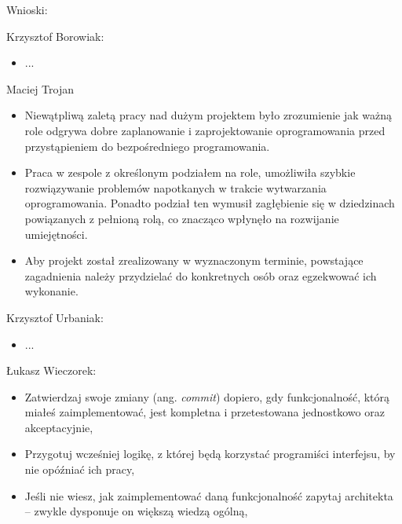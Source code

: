 Wnioski:
\begin{description}
\item Krzysztof Borowiak:
\begin{itemize}
\item ...
\end{itemize}
\item Maciej Trojan
\begin{itemize}
\item Niewątpliwą zaletą pracy nad dużym projektem było zrozumienie jak ważną role odgrywa
dobre zaplanowanie i zaprojektowanie oprogramowania przed przystąpieniem do bezpośredniego
programowania.
\item Praca w zespole z określonym podziałem na role, umożliwiła szybkie rozwiązywanie
problemów napotkanych w trakcie wytwarzania oprogramowania. Ponadto podział ten wymusił
zagłębienie się w dziedzinach powiązanych z pełnioną rolą, co znacząco wpłynęło na
rozwijanie umiejętności.
\item Aby projekt został zrealizowany w wyznaczonym terminie, powstające zagadnienia należy
przydzielać do konkretnych osób oraz egzekwować ich wykonanie.
\end{itemize}
\item Krzysztof Urbaniak:
\begin{itemize}
\item ...
\end{itemize}
\item Łukasz Wieczorek:
\begin{itemize}
\item Zatwierdzaj swoje zmiany (ang. \emph{commit}) dopiero, gdy funkcjonalność, którą miałeś zaimplementować, jest kompletna i przetestowana jednostkowo oraz akceptacyjnie,
\item Przygotuj wcześniej logikę, z której będą korzystać programiści interfejsu, by nie opóźniać ich pracy,
\item Jeśli nie wiesz, jak zaimplementować daną funkcjonalność zapytaj architekta -- zwykle dysponuje on większą wiedzą ogólną,

\end{itemize}
\end{description}
